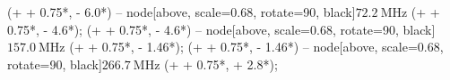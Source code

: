  (\levelLength + \levelConnect + 0.75*\arrowGap, \excitedState - 6.0*\levelGap) 
-- node[above, scale=0.68, rotate=90, black]{$\SI{72.2}{\mega \hertz}$} (\levelLength + \levelConnect + 0.75*\arrowGap, \excitedState - 4.6*\levelGap);
 (\levelLength + \levelConnect + 0.75*\arrowGap, \excitedState - 4.6*\levelGap) 
-- node[above, scale=0.68, rotate=90, black]{$\SI{157.0}{\mega \hertz}$} (\levelLength + \levelConnect + 0.75*\arrowGap, \excitedState - 1.46*\levelGap);
 (\levelLength + \levelConnect + 0.75*\arrowGap, \excitedState - 1.46*\levelGap) 
-- node[above, scale=0.68, rotate=90, black]{$\SI{266.7}{\mega \hertz}$} (\levelLength + \levelConnect + 0.75*\arrowGap, \excitedState + 2.8*\levelGap);